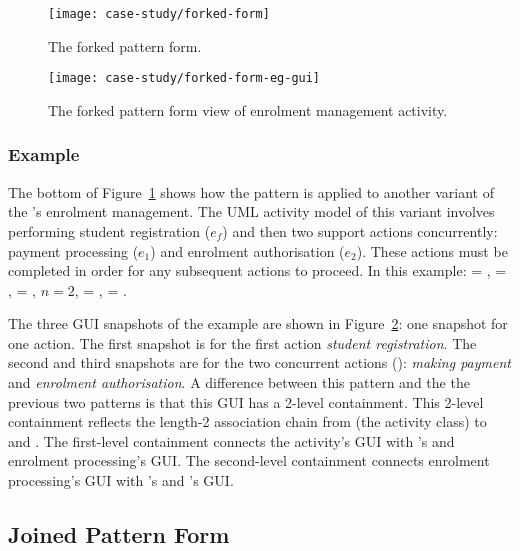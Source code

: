 \begin{figure}%
	\begin{center}
		\texttt{[image: case-study/forked-form]}
	\end{center}
	\caption{The forked pattern form.} %
	\label{fig:forked-form}
\end{figure}

\begin{figure}
	\begin{center}
		\texttt{[image: case-study/forked-form-eg-gui]}
	\end{center}
	\caption{The forked pattern form view of enrolment management activity.} %
	\label{fig:forked-form-eg-gui}
\end{figure}

\subsubsection*{Example}
The bottom of Figure~\ref{fig:forked-form} shows how the pattern is applied to another variant of the \courseman's enrolment management. The UML activity model of this variant involves performing student registration ($ e_f $) and then two support actions concurrently: payment processing ($ e_1 $) and enrolment authorisation ($ e_2 $). These actions must be completed in order for any subsequent actions to proceed.
%
In this example:  = ,  = ,  = , $ n = 2 $,  = ,  = .

The three GUI snapshots of the example are shown in Figure~\ref{fig:forked-form-eg-gui}: one snapshot for one action. The first snapshot is for the first action \textit{student registration}. The second and third snapshots are for the two concurrent actions (\resp): \textit{making payment} and \textit{enrolment authorisation}. A difference between this pattern and the the previous two patterns is that this GUI has a 2-level containment. This 2-level containment reflects the length-2 association chain from  (the activity class) to  and . The first-level containment connects the activity's GUI with 's and enrolment processing's GUI. The second-level containment connects enrolment processing's GUI with 's and 's GUI.

\subsection{Joined Pattern Form} \label{sect:joined-pattern}

